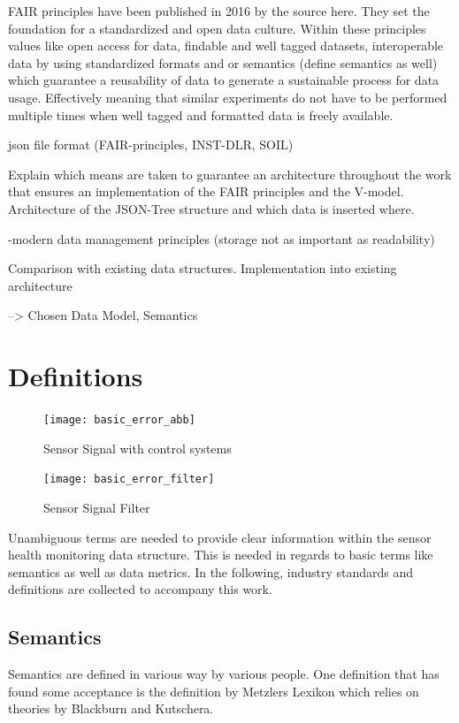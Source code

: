 FAIR principles have been published in 2016 by the  source here. They set the foundation for a standardized and open data culture. Within these principles values like open access for data, findable and well tagged datasets, interoperable data by using standardized formats and or semantics (define semantics as well) which guarantee a reusability of data to generate a sustainable process for data usage. Effectively meaning that similar experiments do not have to be performed multiple times when well tagged and formatted data is freely available.


json file format (FAIR-principles, INST-DLR, SOIL)

Explain which means are taken to guarantee an architecture throughout the work that ensures an implementation of the FAIR principles and the V-model.
Architecture of the JSON-Tree structure and which data is inserted where.


-modern data management principles (storage not as important as readability)

Comparison with existing data structures. Implementation into existing architecture

--> Chosen Data Model, Semantics


\section{Definitions}
\begin{figure}[ht]
	\centering
	\texttt{[image: basic\_error\_abb]}
	\caption{Sensor Signal with control systems}
	\label{fig:basic_error_abb}
\end{figure}
\begin{figure}[ht]
	\centering
	\texttt{[image: basic\_error\_filter]}
	\caption{Sensor Signal Filter}
	\label{fig:basic_error_filter}
\end{figure}


Unambiguous terms are needed to provide clear information within the sensor health monitoring data structure. This is needed in regards to basic terms like semantics as well as data metrics. In the following, industry standards and definitions are collected to accompany this work.

\subsection{Semantics}
Semantics are defined in various way by various people. One definition that has found some acceptance is the definition by Metzlers Lexikon which relies on theories by Blackburn and Kutschera. \cite{shoemaker_spreading_1987,kutschera_sprachphilosophie_1975}


